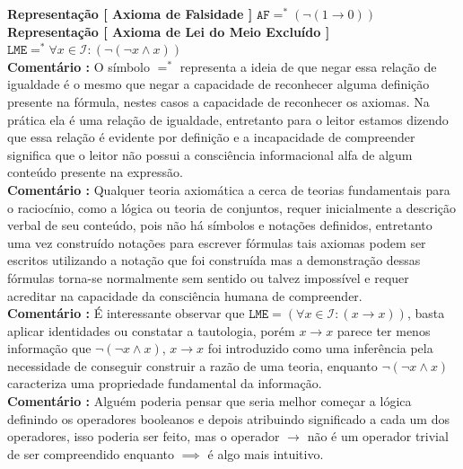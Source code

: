 \documentclass[10pt,a4paper]{report}
\begin{document}
\textbf{Representação [ Axioma de Falsidade ]} $ \texttt{AF} =^{*} ( \neg (1 \rightarrow 0) ) $\\

\textbf{Representação [ Axioma de Lei do Meio Excluído ]} $ \texttt{LME} =^* \forall x \in \mathcal{I} : (\neg (\neg x \wedge x)) $\\

\textbf{Comentário :} O símbolo $=^{*}$ representa a ideia de que negar essa relação de igualdade é o mesmo que negar a capacidade de reconhecer alguma definição presente na fórmula, nestes casos a capacidade de reconhecer os axiomas. Na prática ela é uma relação de igualdade, entretanto para o leitor estamos dizendo que essa relação é evidente por definição e a incapacidade de compreender significa que o leitor não possui a consciência informacional alfa de algum conteúdo presente na expressão. \\

\textbf{Comentário :} Qualquer teoria axiomática a cerca de teorias fundamentais para o raciocínio, como a lógica ou teoria de conjuntos, requer inicialmente a descrição verbal de seu conteúdo, pois não há símbolos e notações definidos, entretanto uma vez construído notações para escrever fórmulas tais axiomas podem ser escritos utilizando a notação que foi construída mas a demonstração dessas fórmulas torna-se normalmente sem sentido ou talvez impossível e requer acreditar na capacidade da consciência humana de compreender.\\

\textbf{Comentário :} É interessante observar que $ \texttt{LME} = ( \forall x \in \mathcal{I} : (x \rightarrow x) ) $, basta aplicar identidades ou constatar a tautologia, porém $x \rightarrow x$ parece ter menos informação que $ \neg (\neg x \wedge x) $, $x \rightarrow x $ foi introduzido como uma inferência pela necessidade de conseguir construir a razão de uma teoria, enquanto $ \neg ( \neg x \wedge x ) $ caracteriza uma propriedade fundamental da informação.\\

\textbf{Comentário :} Alguém poderia pensar que seria melhor começar a lógica definindo os operadores booleanos e depois atribuindo significado a cada um dos operadores, isso poderia ser feito, mas o operador $\rightarrow$ não é um operador trivial de ser compreendido enquanto $\implies$ é algo mais intuitivo.

\hspace{\baselineskip}
\end{document}
